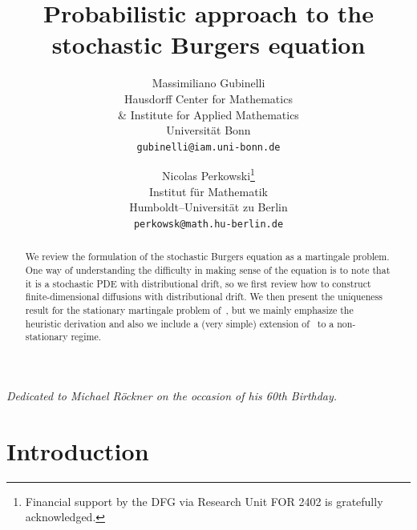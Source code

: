 \documentclass[a4paper,11pt]{article}
\newcommand{\1}{\mathds{1}}
\begin{document}
\title{Probabilistic approach to the stochastic Burgers equation}
\date{}
\author{
  Massimiliano Gubinelli\\
  Hausdorff Center for Mathematics\\
   \& Institute for Applied Mathematics\\
   Universit{\"a}t Bonn \\
  \texttt{gubinelli@iam.uni-bonn.de}
  \and
  Nicolas Perkowski\thanks{Financial support by the DFG via Research Unit FOR 2402 is gratefully acknowledged.} \\
  Institut f\"ur Mathematik \\
  Humboldt--Universit\"at zu Berlin \\
  \texttt{perkowsk@math.hu-berlin.de}
}


\maketitle

\begin{center}
\emph{Dedicated to Michael R{\"o}ckner on the occasion of his 60th
  Birthday.}
\end{center}

\begin{abstract}
  We review the formulation of the stochastic Burgers equation as a martingale problem. One way of understanding the difficulty in making sense of the equation is to note that it is a stochastic PDE with distributional drift, so we first review how to construct finite-dimensional diffusions with distributional drift. We then present the uniqueness result for the stationary martingale problem of~\cite{GP16}, but we mainly emphasize the heuristic derivation and also we include a (very simple) extension of~\cite{GP16} to a non-stationary regime.
\end{abstract}

\section{Introduction}
\end{document}
